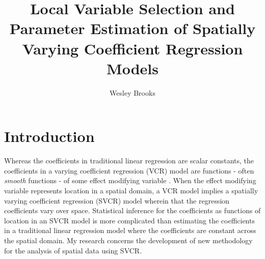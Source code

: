 \documentclass[authoryear, review, 11pt]{elsarticle}
\title{Local Variable Selection and Parameter Estimation of Spatially Varying Coefficient Regression Models}
\author{Wesley Brooks}
\date{}                                           %
\begin{document}

\maketitle



\section{Introduction}
	Whereas the coefficients in traditional linear regression are scalar constants, the coefficients in a varying coefficient regression (VCR) model are functions - often \emph{smooth} functions - of some effect modifying variable \citep{Hastie:1993a}. When the effect modifying variable represents location in a spatial domain, a VCR model implies a spatially varying coefficient regression (SVCR) model wherein that the regression coefficients vary over space. Statistical inference for the coefficients as functions of location in an SVCR model is more complicated than estimating the coefficients in a traditional linear regression model where the coefficients are constant across the spatial domain. My research concerns the development of new methodology for the analysis of spatial data using SVCR.
	
\end{document}
